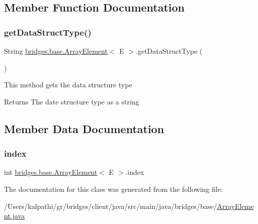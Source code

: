 \subsection{Member Function Documentation}
\mbox{\label{classbridges_1_1base_1_1_array_element_a1d4f3fae7bd986237e364c2cce0bea77}} 
\subsubsection{\texorpdfstring{get\+Data\+Struct\+Type()}{getDataStructType()}}
{\footnotesize\ttfamily String \mbox{\hyperlink{classbridges_1_1base_1_1_array_element}{bridges.\+base.\+Array\+Element}}$<$ E $>$.get\+Data\+Struct\+Type (\begin{DoxyParamCaption}{ }\end{DoxyParamCaption})}

This method gets the data structure type

\begin{DoxyReturn}{Returns}
The date structure type as a string 
\end{DoxyReturn}


\subsection{Member Data Documentation}
\mbox{\label{classbridges_1_1base_1_1_array_element_a79c69e5046da8c297026d1e457a23182}} 
\subsubsection{\texorpdfstring{index}{index}}
{\footnotesize\ttfamily int \mbox{\hyperlink{classbridges_1_1base_1_1_array_element}{bridges.\+base.\+Array\+Element}}$<$ E $>$.index\hspace{0.3cm}{\ttfamily [static]}}



The documentation for this class was generated from the following file\+:\begin{DoxyCompactItemize}
\item 
/\+Users/kalpathi/gr/bridges/client/java/src/main/java/bridges/base/\mbox{\hyperlink{_array_element_8java}{Array\+Element.\+java}}\end{DoxyCompactItemize}
